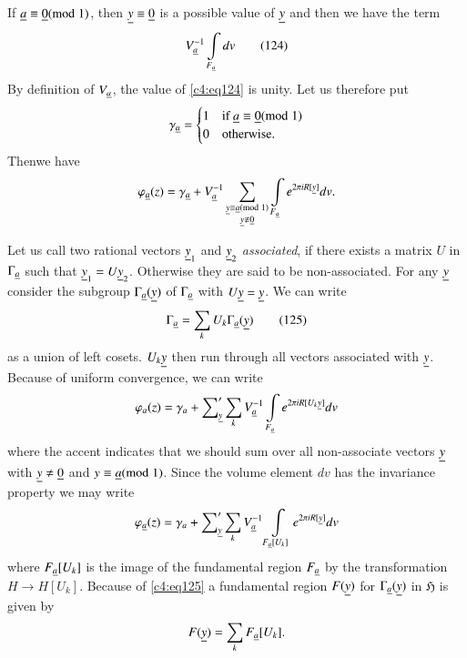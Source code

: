 If $\underline{a}\equiv \underline{0}(\rm{mod} \; 1)$, then $\underline{y}\equiv\underline{0}$ is a
possible value of $\underline{y}$ and then we have the term
\begin{equation*}
V^{-1}_{\underline{a}}\int\limits_{F_{\underline{a}}}dv\tag{124}\label{c4:eq124}
\end{equation*}
By definition of $V_{\underline{a}}$, the value of \eqref{c4:eq124} is unity. Let
us therefore put
$$
\gamma_{\underline{a}}=
\begin{cases}
1 & \text{if } \underline{a}\equiv \underline{0}(\rm{mod} \; 1)\\
0 & \text{otherwise.}
\end{cases}
$$
Then\pageoriginale we have
$$
\varphi_{\underline{a}}(z)=\gamma_{\underline{a}}+V^{-1}_{\underline{a}}\sum_{\substack{\underline{y}\equiv
\underline{a}(\rm{mod} \; 1)\\ \underline{y}\not\equiv
\underline{0}}}\int\limits_{F_{\underline{a}}}e^{2\pi iR[\underline{y}]}dv.
$$

Let us call two rational vectors $\underline{y}_{1}$ and $\underline{y}_{2}$ {\em
  associated}, if there exists a matrix $U$ in $\Gamma_{\underline{a}}$ such
that $\underline{y}_{1}=U\underline{y}_{2}$. Otherwise they are said to be
non-associated. For any $\underline{y}$ consider the subgroup
$\Gamma_{\underline{a}}(\underline{y})$ of $\Gamma_{\underline{a}}$ with
$U\underline{y}=\underline{y}$. We can write
\begin{equation*}
\Gamma_{\underline{a}}=\sum_{k}U_{k}\Gamma_{\underline{a}}(\underline{y})\tag{125}\label{c4:eq125}
\end{equation*}
as a union of left cosets. $U_{k}\underline{y}$ then run through all vectors
associated with $\underline{y}$. Because of uniform convergence, we can write
$$
\varphi_{a}(z)=\gamma_{a}+ {\mathop{\sum}}'_{\underline{y}}\sum_{k}V^{-1}_{\underline{a}}\int\limits_{F_{\underline{a}}}e^{2\pi
  iR[U_{k}\underline{y}]}dv 
$$
where the accent indicates that we should sum over all non-associate
vectors $\underline{y}$ with $\underline{y}\neq \underline{0}$ and
$y\equiv\underline{a}(\rm{mod} \; 1)$. Since the volume element $dv$ has the
invariance property we may write
$$
\varphi_{\underline{a}}(z)=\gamma_{a} +
       {\mathop{\sum}}'_{\underline{y}}\sum_{k}V^{-1}_{\underline{a}}\int\limits_{F_{\underline{a}}[U_{k}]}e^{2\pi 
  iR[\underline{y}]}dv
$$
where $F_{\underline{a}}[U_{k}]$ is the image of the fundamental region
$F_{\underline{a}}$ by the transformation $H\to H[U_{k}]$. Because of
\eqref{c4:eq125} a fundamental region $F(\underline{y})$ for
$\Gamma_{\underline{a}}(\underline{y})$ in $\mathfrak{H}$ is given by 
$$
F(\underline{y})=\sum_{k}F_{\underline{a}}[U_{k}].
$$

